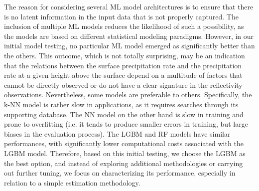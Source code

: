 \documentclass{ametsocV6.1} %
\begin{document}
The reason for considering several ML model architectures is to ensure that there is no latent information in the input data that is not properly captured.  The inclusion of multiple ML models reduces the likelihood of such a possibility, as the models are based on different statistical modeling paradigms. However, in our initial model testing, no particular ML model emerged as significantly better than the others. This outcome, which is not totally surprising, may be an indication that the relations between the surface precipitation rate and the precipitation rate at a given height above the surface depend on a multitude of factors that cannot be directly observed or do not have a clear signature in the reflectivity observations.  Nevertheless, some models are preferable to others. Specifically, the k-NN model is rather slow in applications, as it requires searches through its supporting database.  The NN model on the other hand is slow in training and prone to overfitting (i.e. it tends to produce smaller errors in training, but large biases in the evaluation process).  The LGBM and RF models have similar performances, with significantly lower computational costs associated with the LGBM model. Therefore, based on this initial testing, we choose the LGBM as the best option, and instead of exploring additional methodologies or carrying out further tuning, we focus on characterizing its performance, especially in relation to a simple estimation methodology.
\end{document}
